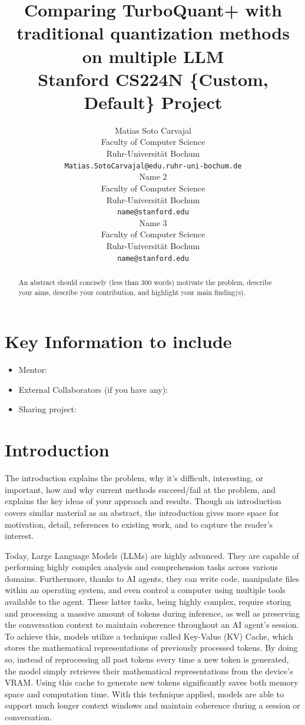 \documentclass{article}
\title{
  Comparing TurboQuant+ with traditional quantization methods on multiple LLM \\
  \vspace{1em}
  \small{\normalfont{} Stanford CS224N \{Custom, Default\} Project}  %
}
\author{
  Matias Soto Carvajal \\
  Faculty of Computer Science \\
  Ruhr-Universität Bochum \\
  \texttt{Matias.SotoCarvajal@edu.ruhr-uni-bochum.de} \\
  \And{}
  Name 2 \\
  Faculty of Computer Science \\
  Ruhr-Universität Bochum \\
  \texttt{name@stanford.edu} \\
  \And{}
  Name 3 \\
  Faculty of Computer Science \\
  Ruhr-Universität Bochum \\
  \texttt{name@stanford.edu} \\
}
\begin{document}
\maketitle

\begin{abstract}
An abstract should concisely (less than 300 words) motivate the problem, describe your aims, describe your contribution, and highlight your main finding(s). 
\end{abstract}


\section{Key Information to include}
\begin{itemize}
    \item Mentor:
    \item External Collaborators (if you have any):
    \item Sharing project:
\end{itemize}


\section{Introduction}
The introduction explains the problem, why it's difficult, interesting, or important, how and why current methods succeed/fail at the problem, and explains the key ideas of your approach and results. Though an introduction covers similar material as an abstract, the introduction gives more space for motivation, detail, references to existing work, and to capture the reader's interest.

Today, Large Language Models (LLMs) are highly advanced. They are capable of performing highly complex analysis and comprehension tasks across various domains. Furthermore, thanks to AI agents, they can write code, manipulate files within an operating system, and even control a computer using multiple tools available to the agent.
These latter tasks, being highly complex, require storing and processing a massive amount of tokens during inference, as well as preserving the conversation context to maintain coherence throughout an AI agent's session. To achieve this, models utilize a technique called Key-Value (KV) Cache, which stores the mathematical representations of previously processed tokens. By doing so, instead of reprocessing all past tokens every time a new token is generated, the model simply retrieves their mathematical representations from the device's VRAM. Using this cache to generate new tokens significantly saves both memory space and computation time.
With this technique applied, models are able to support much longer context windows and maintain coherence during a session or conversation.
\end{document}
